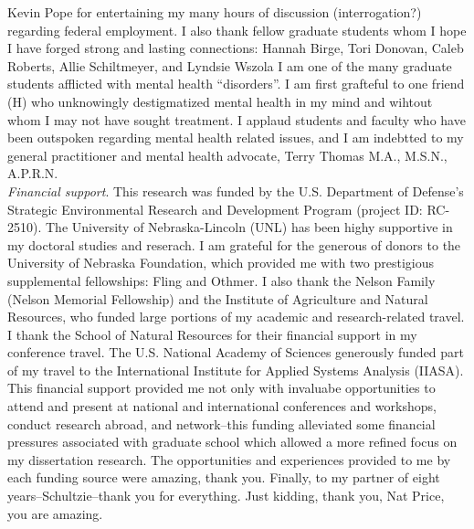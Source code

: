 \documentclass[12pt,twoside,openany]{reedthesis}
\begin{document}
\begin{acknowledgements}
    Kevin Pope for entertaining my many hours of discussion (interrogation?)
    regarding federal employment. I also thank fellow graduate students whom
    I hope I have forged strong and lasting connections: Hannah Birge, Tori
    Donovan, Caleb Roberts, Allie Schiltmeyer, and Lyndsie Wszola I am one
    of the many graduate students afflicted with mental health
    ``disorders''. I am first grafteful to one friend (H) who unknowingly
    destigmatized mental health in my mind and wihtout whom I may not have
    sought treatment. I applaud students and faculty who have been outspoken
    regarding mental health related issues, and I am indebtted to my general
    practitioner and mental health advocate, Terry Thomas M.A., M.S.N.,
    A.P.R.N.\\
    \emph{Financial support}. This research was funded by the U.S.
    Department of Defense's Strategic Environmental Research and Development
    Program (project ID: RC-2510). The University of Nebraska-Lincoln (UNL)
    has been highy supportive in my doctoral studies and reserach. I am
    grateful for the generous of donors to the University of Nebraska
    Foundation, which provided me with two prestigious supplemental
    fellowships: Fling and Othmer. I also thank the Nelson Family (Nelson
    Memorial Fellowship) and the Institute of Agriculture and Natural
    Resources, who funded large portions of my academic and research-related
    travel. I thank the School of Natural Resources for their financial
    support in my conference travel. The U.S. National Academy of Sciences
    generously funded part of my travel to the International Institute for
    Applied Systems Analysis (IIASA). This financial support provided me not
    only with invaluabe opportunities to attend and present at national and
    international conferences and workshops, conduct research abroad, and
    network--this funding alleviated some financial pressures associated
    with graduate school which allowed a more refined focus on my
    dissertation research. The opportunities and experiences provided to me
    by each funding source were amazing, thank you. Finally, to my partner
    of eight years--Schultzie--thank you for everything. Just kidding, thank
    you, Nat Price, you are amazing.
  \end{acknowledgements}

  \hypersetup{linkcolor=black}
  \setcounter{tocdepth}{2}
  \tableofcontents

  \listoftables

  \listoffigures
\end{document}
